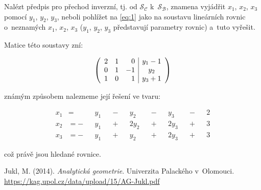 \documentclass[a4paper, 12pt]{article}
\begin{document}
\noindent Nalézt předpis pro přechod inverzní, tj. od $\mathcal{S_C}$ k~$\mathcal{S_B}$, znamena vyjádřit $x_1$, $x_2$, $x_3$ pomocí $y_1$, $y_2$, $y_3$, neboli pohlížet na \eqref{eq:1} jako na soustavu lineárních rovnic o~neznamých $x_1$, $x_2$, $x_3$ ($y_1$, $y_2$, $y_3$ představují parametry rovnic) a~tuto vyřešit. 

\pagebreak

\noindent Matice této soustavy zní:

$$\left(
	\begin{array}{ccc|c}
			2 & 1 & \hphantom{-}0 & {y_1-1} \\
			0 & 1 & {-1}         & y_2     \\
			1 & 0 & \hphantom{-}1 & {y_3+1} \\
		\end{array}
	\right)$$

\noindent známým způsobem nalezneme její řešení ve tvaru:

\begin{equation*}
	\begin{aligned}
		x_1 & =  &  & y_1 &  & - &  & y_2  &  & - &  & y_3  &  & - &  & 2 \\
		x_2 & =- &  & y_1 &  & + &  & 2y_2 &  & + &  & 2y_3 &  & + &  & 3 \\
		x_3 & =- &  & y_1 &  & + &  & y_2  &  & + &  & 2y_3 &  & + &  & 3
	\end{aligned}
\end{equation*}

\noindent což právě jsou hledané rovnice.

\begin{thebibliography}{9}
	Jukl, M. (2014). \textit{Analytická geometrie}. Univerzita Palackého v~Olomouci. \break
	\url{https://kag.upol.cz/data/upload/15/AG-Jukl.pdf}
\end{thebibliography}
\end{document}
